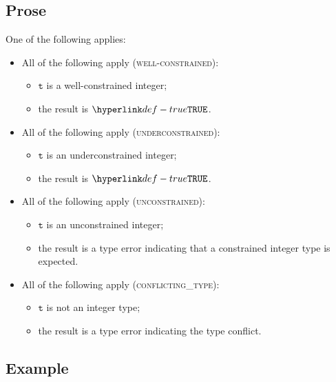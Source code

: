\documentclass{book}
\newcommand\vt[0]{\texttt{t}}
\begin{document}
\subsection{Prose}
One of the following applies:
\begin{itemize}
  \item All of the following apply (\textsc{well-constrained}):
  \begin{itemize}
    \item $\vt$ is a well-constrained integer;
    \item the result is $\True$.
  \end{itemize}

  \item All of the following apply (\textsc{underconstrained}):
  \begin{itemize}
    \item $\vt$ is an underconstrained integer;
    \item the result is $\True$.
  \end{itemize}

  \item All of the following apply (\textsc{unconstrained}):
  \begin{itemize}
    \item $\vt$ is an unconstrained integer;
    \item the result is a type error indicating that a constrained integer type is expected.
  \end{itemize}

  \item All of the following apply (\textsc{conflicting\_type}):
  \begin{itemize}
    \item $\vt$ is not an integer type;
    \item the result is a type error indicating the type conflict.
  \end{itemize}
\end{itemize}

\subsection{Example}

\end{document}
